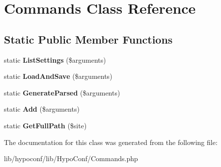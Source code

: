 \hypertarget{class_hypo_conf_1_1_commands}{
\section{\-Commands \-Class \-Reference}
\label{class_hypo_conf_1_1_commands}
}
\subsection*{\-Static \-Public \-Member \-Functions}
\begin{DoxyCompactItemize}
\item 
\hypertarget{class_hypo_conf_1_1_commands_aab14254fec9e08231f6b6516fe01c502}{
static {\bfseries \-List\-Settings} (\$arguments)}
\label{class_hypo_conf_1_1_commands_aab14254fec9e08231f6b6516fe01c502}

\item 
\hypertarget{class_hypo_conf_1_1_commands_abfabf88e7af3658c94a068395ced05df}{
static {\bfseries \-Load\-And\-Save} (\$arguments)}
\label{class_hypo_conf_1_1_commands_abfabf88e7af3658c94a068395ced05df}

\item 
\hypertarget{class_hypo_conf_1_1_commands_a2f6d54a0a7bb87644805a310c71ba457}{
static {\bfseries \-Generate\-Parsed} (\$arguments)}
\label{class_hypo_conf_1_1_commands_a2f6d54a0a7bb87644805a310c71ba457}

\item 
\hypertarget{class_hypo_conf_1_1_commands_a52c78aa14dd8bfa3414fa92d429e00db}{
static {\bfseries \-Add} (\$arguments)}
\label{class_hypo_conf_1_1_commands_a52c78aa14dd8bfa3414fa92d429e00db}

\item 
\hypertarget{class_hypo_conf_1_1_commands_a662ff155617412dc0aa665681935f6fe}{
static {\bfseries \-Get\-Full\-Path} (\$site)}
\label{class_hypo_conf_1_1_commands_a662ff155617412dc0aa665681935f6fe}

\end{DoxyCompactItemize}


\-The documentation for this class was generated from the following file\-:\begin{DoxyCompactItemize}
\item 
lib/hypoconf/lib/\-Hypo\-Conf/\-Commands.\-php\end{DoxyCompactItemize}
